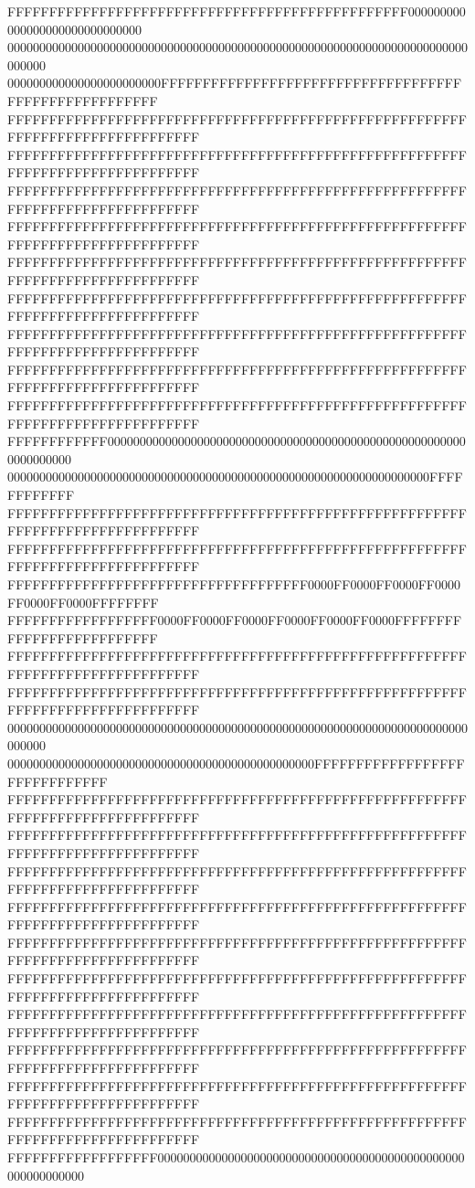 FFFFFFFFFFFFFFFFFFFFFFFFFFFFFFFFFFFFFFFFFFFFFFFF000000000000000000000000000000
000000000000000000000000000000000000000000000000000000000000000000000000000000
000000000000000000000000FFFFFFFFFFFFFFFFFFFFFFFFFFFFFFFFFFFFFFFFFFFFFFFFFFFFFF
FFFFFFFFFFFFFFFFFFFFFFFFFFFFFFFFFFFFFFFFFFFFFFFFFFFFFFFFFFFFFFFFFFFFFFFFFFFFFF
FFFFFFFFFFFFFFFFFFFFFFFFFFFFFFFFFFFFFFFFFFFFFFFFFFFFFFFFFFFFFFFFFFFFFFFFFFFFFF
FFFFFFFFFFFFFFFFFFFFFFFFFFFFFFFFFFFFFFFFFFFFFFFFFFFFFFFFFFFFFFFFFFFFFFFFFFFFFF
FFFFFFFFFFFFFFFFFFFFFFFFFFFFFFFFFFFFFFFFFFFFFFFFFFFFFFFFFFFFFFFFFFFFFFFFFFFFFF
FFFFFFFFFFFFFFFFFFFFFFFFFFFFFFFFFFFFFFFFFFFFFFFFFFFFFFFFFFFFFFFFFFFFFFFFFFFFFF
FFFFFFFFFFFFFFFFFFFFFFFFFFFFFFFFFFFFFFFFFFFFFFFFFFFFFFFFFFFFFFFFFFFFFFFFFFFFFF
FFFFFFFFFFFFFFFFFFFFFFFFFFFFFFFFFFFFFFFFFFFFFFFFFFFFFFFFFFFFFFFFFFFFFFFFFFFFFF
FFFFFFFFFFFFFFFFFFFFFFFFFFFFFFFFFFFFFFFFFFFFFFFFFFFFFFFFFFFFFFFFFFFFFFFFFFFFFF
FFFFFFFFFFFFFFFFFFFFFFFFFFFFFFFFFFFFFFFFFFFFFFFFFFFFFFFFFFFFFFFFFFFFFFFFFFFFFF
FFFFFFFFFFFF000000000000000000000000000000000000000000000000000000000000000000
000000000000000000000000000000000000000000000000000000000000000000FFFFFFFFFFFF
FFFFFFFFFFFFFFFFFFFFFFFFFFFFFFFFFFFFFFFFFFFFFFFFFFFFFFFFFFFFFFFFFFFFFFFFFFFFFF
FFFFFFFFFFFFFFFFFFFFFFFFFFFFFFFFFFFFFFFFFFFFFFFFFFFFFFFFFFFFFFFFFFFFFFFFFFFFFF
FFFFFFFFFFFFFFFFFFFFFFFFFFFFFFFFFFFF0000FF0000FF0000FF0000FF0000FF0000FFFFFFFF
FFFFFFFFFFFFFFFFFF0000FF0000FF0000FF0000FF0000FF0000FFFFFFFFFFFFFFFFFFFFFFFFFF
FFFFFFFFFFFFFFFFFFFFFFFFFFFFFFFFFFFFFFFFFFFFFFFFFFFFFFFFFFFFFFFFFFFFFFFFFFFFFF
FFFFFFFFFFFFFFFFFFFFFFFFFFFFFFFFFFFFFFFFFFFFFFFFFFFFFFFFFFFFFFFFFFFFFFFFFFFFFF
000000000000000000000000000000000000000000000000000000000000000000000000000000
000000000000000000000000000000000000000000000000FFFFFFFFFFFFFFFFFFFFFFFFFFFFFF
FFFFFFFFFFFFFFFFFFFFFFFFFFFFFFFFFFFFFFFFFFFFFFFFFFFFFFFFFFFFFFFFFFFFFFFFFFFFFF
FFFFFFFFFFFFFFFFFFFFFFFFFFFFFFFFFFFFFFFFFFFFFFFFFFFFFFFFFFFFFFFFFFFFFFFFFFFFFF
FFFFFFFFFFFFFFFFFFFFFFFFFFFFFFFFFFFFFFFFFFFFFFFFFFFFFFFFFFFFFFFFFFFFFFFFFFFFFF
FFFFFFFFFFFFFFFFFFFFFFFFFFFFFFFFFFFFFFFFFFFFFFFFFFFFFFFFFFFFFFFFFFFFFFFFFFFFFF
FFFFFFFFFFFFFFFFFFFFFFFFFFFFFFFFFFFFFFFFFFFFFFFFFFFFFFFFFFFFFFFFFFFFFFFFFFFFFF
FFFFFFFFFFFFFFFFFFFFFFFFFFFFFFFFFFFFFFFFFFFFFFFFFFFFFFFFFFFFFFFFFFFFFFFFFFFFFF
FFFFFFFFFFFFFFFFFFFFFFFFFFFFFFFFFFFFFFFFFFFFFFFFFFFFFFFFFFFFFFFFFFFFFFFFFFFFFF
FFFFFFFFFFFFFFFFFFFFFFFFFFFFFFFFFFFFFFFFFFFFFFFFFFFFFFFFFFFFFFFFFFFFFFFFFFFFFF
FFFFFFFFFFFFFFFFFFFFFFFFFFFFFFFFFFFFFFFFFFFFFFFFFFFFFFFFFFFFFFFFFFFFFFFFFFFFFF
FFFFFFFFFFFFFFFFFFFFFFFFFFFFFFFFFFFFFFFFFFFFFFFFFFFFFFFFFFFFFFFFFFFFFFFFFFFFFF
FFFFFFFFFFFFFFFFFF000000000000000000000000000000000000000000000000000000000000
